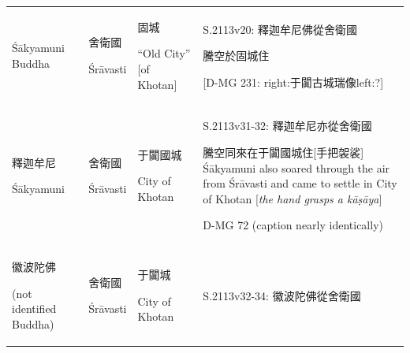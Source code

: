 \documentclass[
  english,
  a4paper,
  DIV=12,
  footlines=2.1,
  usegeometry=true]{scrartcl}
\begin{document}
\begin{longtable}[]{@{}llll@{}}
\begin{minipage}[t]{0.18\columnwidth}
Śākyamuni Buddha\strut
\end{minipage} & \begin{minipage}[t]{0.13\columnwidth}\raggedright
舍衛國

Śrāvasti\strut
\end{minipage} & \begin{minipage}[t]{0.13\columnwidth}\raggedright
固城

``Old City'' {[}of Khotan{]}\strut
\end{minipage} & \begin{minipage}[t]{0.44\columnwidth}\raggedright
S.2113v20: 釋迦牟尼佛從舍衛國

騰空於固城住

{[}D-MG 231: right:于闐古城瑞像left:?{]}\strut
\end{minipage}\tabularnewline
\begin{minipage}[t]{0.18\columnwidth}\raggedright
釋迦牟尼

Śākyamuni\strut
\end{minipage} & \begin{minipage}[t]{0.13\columnwidth}\raggedright
舍衛國

Śrāvasti\strut
\end{minipage} & \begin{minipage}[t]{0.13\columnwidth}\raggedright
于闐國城

City of Khotan\strut
\end{minipage} & \begin{minipage}[t]{0.44\columnwidth}\raggedright
S.2113v31-32: 釋迦牟尼亦從舍衛國

騰空同來在于闐國城住{[}手把袈裟{]} Śākyamuni also soared through the air
from Śrāvasti and came to settle in City of Khotan {[}\emph{the hand
grasps a kāṣāya}{]}

D-MG 72 (caption nearly identically)\strut
\end{minipage}\tabularnewline
\begin{minipage}[t]{0.18\columnwidth}\raggedright
徽波陀佛

(not identified Buddha)\strut
\end{minipage} & \begin{minipage}[t]{0.13\columnwidth}\raggedright
舍衛國

Śrāvasti\strut
\end{minipage} & \begin{minipage}[t]{0.13\columnwidth}\raggedright
于闐城

City of Khotan\strut
\end{minipage} & \begin{minipage}[t]{0.44\columnwidth}\raggedright
S.2113v32-34: 徽波陀佛從舍衛國


\end{minipage}
\end{longtable}
\end{document}
